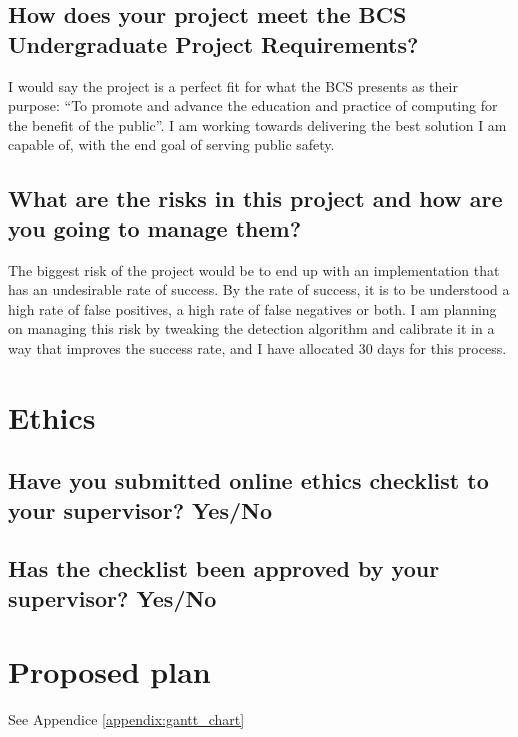 \begin{mdframed}
	\tocless\subsection{How does your project meet the BCS Undergraduate Project Requirements?}
	I would say the project is a perfect fit for what the BCS presents as their purpose: “To promote and advance the education and practice of computing for the benefit of the public”. I am working towards delivering the best solution I am capable of, with the end goal of serving public safety.


	\tocless\subsection{What are the risks in this project and how are you going to manage them?}
	The biggest risk of the project would be to end up with an implementation that has an undesirable rate of success. By the rate of success, it is to be understood a high rate of false positives, a high rate of false negatives or both. I am planning on managing this risk by tweaking the detection algorithm and calibrate it in a way that improves the success rate, and I have allocated 30 days for this process.
\end{mdframed}

\tocless\section{Ethics}
\begin{mdframed}
	\tocless\subsection{Have you submitted online ethics checklist to your supervisor? \textbf{Yes}/No}
	\tocless\subsection{Has the checklist been approved by your supervisor? \textbf{Yes}/No}
\end{mdframed}

\tocless\section{Proposed plan}
See Appendice \ref{appendix:gantt_chart}